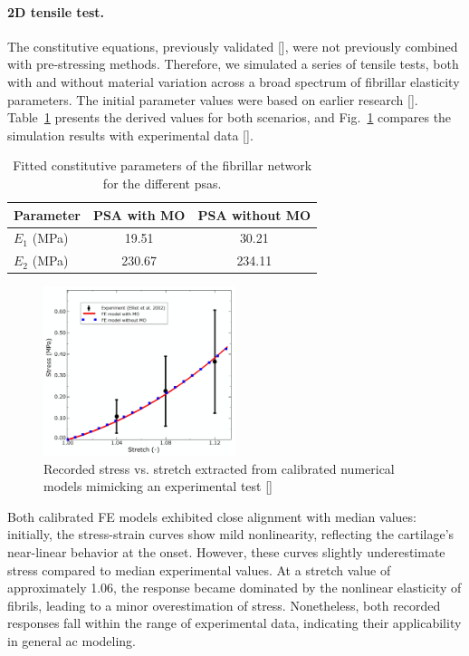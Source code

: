 \documentclass[12pt,a4paper]{report}
\begin{document}
\paragraph{2D tensile test.} The constitutive equations, previously validated [\cite{sajjadinia2019}], were not previously combined with pre-stressing methods. Therefore, we simulated a series of tensile tests, both with and without material variation across a broad spectrum of fibrillar elasticity parameters. The initial parameter values were based on earlier research [\cite{wilson2007}]. Table~\ref{table:calibraion} presents the derived values for both scenarios, and Fig.~\ref{fig:calibration} compares the simulation results with experimental data [\cite{elliott2002}].
%
\begin{table}\centering
\caption{Fitted constitutive parameters of the fibrillar network for the different \acp{psa}.}
\label{table:calibraion}
\begin{tabular}{lcc}
\hline
\textbf{Parameter}  
& \textbf{PSA with MO}
& \textbf{PSA without MO}
\\
\hline
$E_1$ (MPa) 
& 19.51&    30.21 
\\
$E_2$ (MPa) & 230.67&    234.11 \\
\hline
\end{tabular}
\end{table}
%
\begin{figure}\centering
\includegraphics[width=0.5\textwidth]{img/calibration.jpg}
\caption{Recorded stress vs. stretch extracted from calibrated numerical models mimicking an experimental test [\cite{elliott2002}]}
\label{fig:calibration}
\end{figure}

Both calibrated FE models exhibited close alignment with median values: initially, the stress-strain curves show mild nonlinearity, reflecting the cartilage's near-linear behavior at the onset. However, these curves slightly underestimate stress compared to median experimental values. At a stretch value of approximately 1.06, the response became dominated by the nonlinear elasticity of fibrils, leading to a minor overestimation of stress. Nonetheless, both recorded responses fall within the range of experimental data, indicating their applicability in general \ac{ac} modeling.
\end{document}
